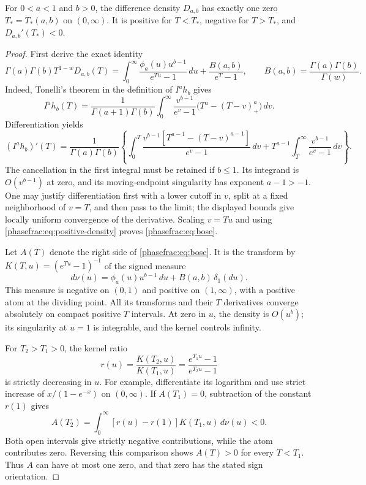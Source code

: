 \begin{lemma}
\label{phasefrac:lem:density}
For $0<a<1$ and $b>0$, the difference density $D_{a,b}$ has exactly
one zero $T_*=T_*(a,b)$ on $(0,\infty)$. It is positive for $T<T_*$,
negative for $T>T_*$, and $D_{a,b}'(T_*)<0$.
\end{lemma}
\begin{proof}
First derive the exact identity
\begin{equation}\label{phasefrac:eq:bose}
 \Gamma(a)\Gamma(b)T^{1-w}D_{a,b}(T)
 =\int_0^\infty\frac{\phi_a(u)u^{b-1}}{e^{Tu}-1}\,du
       +\frac{B(a,b)}{e^T-1},
 \qquad B(a,b)=\frac{\Gamma(a)\Gamma(b)}{\Gamma(w)}.
\end{equation}
Indeed, Tonelli's theorem in the definition of $I^ah_b$ gives
\[
 I^ah_b(T)=\frac1{\Gamma(a+1)\Gamma(b)}
   \int_0^\infty\frac{v^{b-1}}{e^v-1}
        \bigl(T^a-(T-v)_+^a\bigr)\,dv.
\]
Differentiation yields
\[
 (I^ah_b)'(T)=\frac1{\Gamma(a)\Gamma(b)}
 \left\{\int_0^T\frac{v^{b-1}
       [T^{a-1}-(T-v)^{a-1}]}{e^v-1}\,dv
       +T^{a-1}\int_T^\infty\frac{v^{b-1}}{e^v-1}\,dv\right\}.
\]
The cancellation in the first integral must be retained if $b\le1$.
Its integrand is $O(v^{b-1})$ at zero, and its moving-endpoint
singularity has exponent $a-1>-1$. One may justify differentiation
first with a lower cutoff in $v$, split at a fixed neighborhood of
$v=T$, and then pass to the limit; the displayed bounds give locally
uniform convergence of the derivative. Scaling $v=Tu$ and using
\eqref{phasefrac:eq:positive-density} proves \eqref{phasefrac:eq:bose}.

Let $A(T)$ denote the right side of \eqref{phasefrac:eq:bose}.
It is the transform by $K(T,u)=(e^{Tu}-1)^{-1}$ of the signed measure
\[
 d\nu(u)=\phi_a(u)u^{b-1}\,du+B(a,b)\,\delta_1(du).
\]
This measure is negative on $(0,1)$ and positive on $(1,\infty)$,
with a positive atom at the dividing point. All its transforms and
their $T$ derivatives converge absolutely on compact positive
$T$ intervals. At zero in $u$, the density is $O(u^b)$; its
singularity at $u=1$ is integrable, and the kernel controls infinity.

For $T_2>T_1>0$, the kernel ratio
\[
 r(u)=\frac{K(T_2,u)}{K(T_1,u)}
      =\frac{e^{T_1u}-1}{e^{T_2u}-1}
\]
is strictly decreasing in $u$. For example, differentiate its
logarithm and use strict increase of $x/(1-e^{-x})$ on $(0,\infty)$.
If $A(T_1)=0$, subtraction of the constant $r(1)$ gives
\[
 A(T_2)=\int_0^\infty[r(u)-r(1)]K(T_1,u)\,d\nu(u)<0.
\]
Both open intervals give strictly negative contributions, while the
atom contributes zero. Reversing this comparison shows $A(T)>0$
for every $T<T_1$. Thus $A$ can have at most one zero, and that zero
has the stated sign orientation.


\end{proof}
